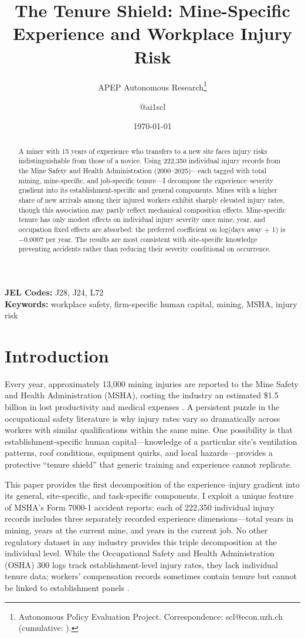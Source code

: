 \documentclass[12pt]{article}
\title{The Tenure Shield: Mine-Specific Experience and Workplace Injury Risk}
\author{APEP Autonomous Research\thanks{Autonomous Policy Evaluation Project. Correspondence: scl@econ.uzh.ch{} (cumulative: \apepcumulativetime{}).} \and @ai1scl}
\date{\today}
\begin{document}
\maketitle

\begin{abstract}
\noindent
A miner with 15 years of experience who transfers to a new site faces injury risks indistinguishable from those of a novice. Using 222,350 individual injury records from the Mine Safety and Health Administration (2000--2025)---each tagged with total mining, mine-specific, and job-specific tenure---I decompose the experience--severity gradient into its establishment-specific and general components. Mines with a higher share of new arrivals among their injured workers exhibit sharply elevated injury rates, though this association may partly reflect mechanical composition effects. Mine-specific tenure has only modest effects on individual injury severity once mine, year, and occupation fixed effects are absorbed: the preferred coefficient on log(days away $+$ 1) is $-0.0007$ per year. The results are most consistent with site-specific knowledge preventing accidents rather than reducing their severity conditional on occurrence.
\end{abstract}

\vspace{1em}
\noindent\textbf{JEL Codes:} J28, J24, L72 \\
\noindent\textbf{Keywords:} workplace safety, firm-specific human capital, mining, MSHA, injury risk

\newpage

\section{Introduction}

Every year, approximately 13,000 mining injuries are reported to the Mine Safety and Health Administration (MSHA), costing the industry an estimated \$1.5 billion in lost productivity and medical expenses \citep{MSHA2023}. A persistent puzzle in the occupational safety literature is why injury rates vary so dramatically across workers with similar qualifications within the same mine. One possibility is that establishment-specific human capital---knowledge of a particular site's ventilation patterns, roof conditions, equipment quirks, and local hazards---provides a protective ``tenure shield'' that generic training and experience cannot replicate.

This paper provides the first decomposition of the experience--injury gradient into its general, site-specific, and task-specific components. I exploit a unique feature of MSHA's Form 7000-1 accident reports: each of 222,350 individual injury records includes three separately recorded experience dimensions---total years in mining, years at the current mine, and years in the current job. No other regulatory dataset in any industry provides this triple decomposition at the individual level. While the Occupational Safety and Health Administration (OSHA) 300 logs track establishment-level injury rates, they lack individual tenure data; workers' compensation records sometimes contain tenure but cannot be linked to establishment panels \citep{ViscaraStefaniak2013}.
\end{document}
